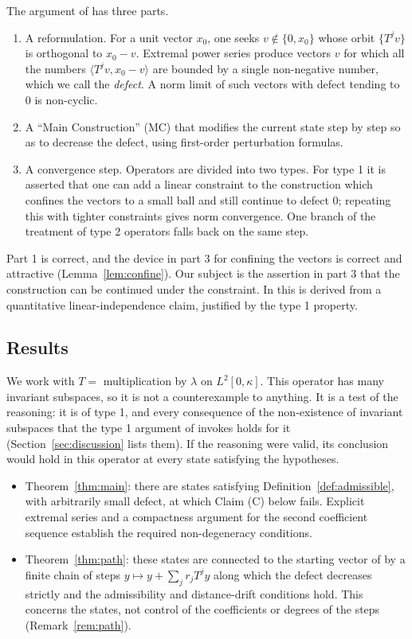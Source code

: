 \documentclass[11pt]{article}
\theoremstyle{definition}
\newcommand{\ip}[2]{\langle #1,#2\rangle}
\begin{document}
The argument of \cite{E} has three parts.
\begin{enumerate}[leftmargin=2em]
\item A reformulation. For a unit vector $x_0$, one seeks $v\notin\{0,x_0\}$ whose orbit
$\{T^jv\}$ is orthogonal to $x_0-v$. Extremal power series produce vectors $v$ for which all
the numbers $\ip{T^jv}{x_0-v}$ are bounded by a single non-negative number, which we call the
\emph{defect}. A norm limit of such vectors with defect tending to $0$ is non-cyclic.
\item A ``Main Construction'' (MC) that modifies the current state step by step so as to
decrease the defect, using first-order perturbation formulas.
\item A convergence step. Operators are divided into two types. For type 1 it is asserted that
one can add a linear constraint to the construction which confines the vectors to a small ball
and still continue to defect $0$; repeating this with tighter constraints gives norm
convergence. One branch of the treatment of type 2 operators falls back on the same step.
\end{enumerate}
Part 1 is correct, and the device in part 3 for confining the vectors is correct and
attractive (Lemma~\ref{lem:confine}). Our subject is the assertion in part 3 that the
construction can be continued under the constraint. In \cite{E} this is derived from a
quantitative linear-independence claim, justified by the type 1 property.

\subsection*{Results}
We work with $T=$ multiplication by $\lambda$ on $L^2[0,\kappa]$. This operator has many
invariant subspaces, so it is not a counterexample to anything. It is a test of the reasoning:
it is of type 1, and every consequence of the non-existence of invariant subspaces that the
type 1 argument of \cite{E} invokes holds for it (Section~\ref{sec:discussion} lists them). If
the reasoning were valid, its conclusion would hold in this operator at every state satisfying
the hypotheses.
\begin{itemize}[leftmargin=2em]
\item Theorem~\ref{thm:main}: there are states satisfying
Definition~\ref{def:admissible}, with arbitrarily small defect, at which Claim (C) below
fails. Explicit extremal series and a compactness argument for the second coefficient
sequence establish the required non-degeneracy conditions.
\item Theorem~\ref{thm:path}: these states are connected to the starting vector of \cite{E} by
a finite chain of steps $y\mapsto y+\sum_jr_jT^jy$ along which the defect decreases strictly
and the admissibility and distance-drift conditions hold. This concerns the states, not
control of the coefficients or degrees of the steps (Remark~\ref{rem:path}).
\end{itemize}
\end{document}
